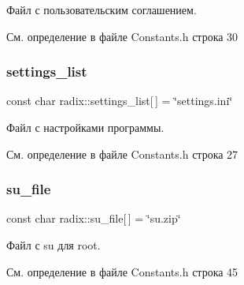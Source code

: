 Файл с пользовательским соглашением. 

См. определение в файле Constants.\+h строка 30

\mbox{\label{namespaceradix_a43bff57dbd1b7dcebee0228ccbab7f17}} 
\subsubsection{\texorpdfstring{settings\+\_\+list}{settings\_list}}
{\footnotesize\ttfamily const char radix\+::settings\+\_\+list\mbox{[}$\,$\mbox{]} = \char`\"{}settings.\+ini\char`\"{}}

Файл с настройками программы. 

См. определение в файле Constants.\+h строка 27

\mbox{\label{namespaceradix_abcd4cb3ab01a6a642ba224e2d9b1eda5}} 
\subsubsection{\texorpdfstring{su\+\_\+file}{su\_file}}
{\footnotesize\ttfamily const char radix\+::su\+\_\+file\mbox{[}$\,$\mbox{]} = \char`\"{}su.\+zip\char`\"{}}

Файл с su для root. 

См. определение в файле Constants.\+h строка 45

